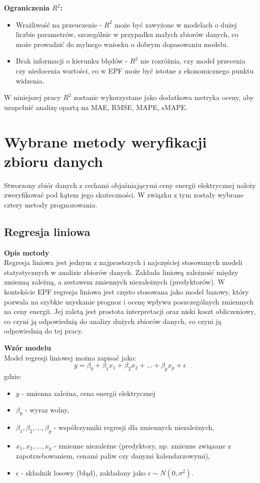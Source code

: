 \textbf{Ograniczenia \( R^2 \):}
\begin{itemize}
    \item Wrażliwość na przeuczenie - \( R^2 \) może być zawyżone w modelach o dużej liczbie parametrów, szczególnie w przypadku małych zbiorów danych, co może prowadzić do mylnego wniosku o dobrym dopasowaniu modelu.
    \item Brak informacji o kierunku błędów - \( R^2 \) nie rozróżnia, czy model przecenia czy niedocenia wartości, co w EPF może być istotne z ekonomicznego punktu widzenia.
\end{itemize}

W niniejszej pracy \( R^2 \) zostanie wykorzystane jako dodatkowa metryka oceny, aby uzupełnić analizę opartą na MAE, RMSE, MAPE, sMAPE.

\section{Wybrane metody weryfikacji zbioru danych}
\label{sec:metody_weryfikacji_zbioru_danych}

Stworzony zbiór danych z cechami objaśniającymi ceny energii elektrycznej należy zweryfikować pod kątem jego skuteczności. W związku z tym zostały wybrane cztery metody prognozowania.

\subsection{Regresja liniowa}

\textbf{Opis metody} \\
Regresja liniowa jest jednym z najprostszych i najczęściej stosowanych modeli statystycznych w analizie zbiorów danych. Zakłada liniową zależność między zmienną zależną, a zestawem zmiennych niezależnych (predyktorów). W kontekście EPF regresja liniowa jest często stosowana jako model bazowy, który pozwala na szybkie uzyskanie prognoz i ocenę wpływu poszczególnych zmiennych na ceny energii. Jej zaletą jest prostota interpretacji oraz niski koszt obliczeniowy, co czyni ją odpowiednią do analizy dużych zbiorów danych, co czyni ją odpowiednią do tej pracy.

\textbf{Wzór modelu} \\
Model regresji liniowej można zapisać jako:
\begin{equation}
y = \beta_0 + \beta_1 x_1 + \beta_2 x_2 + \dots + \beta_p x_p + \epsilon
\end{equation}
gdzie:
\begin{itemize}
    \item \( y \) - zmienna zależna, cena energii elektrycznej
    \item \( \beta_0 \) - wyraz wolny,
    \item \( \beta_1, \beta_2, \dots, \beta_p \) - współczynniki regresji dla zmiennych niezależnych,
    \item \( x_1, x_2, \dots, x_p \) - zmienne niezależne (predyktory, np. zmienne związane z zapotrzebowaniem, cenami paliw czy danymi kalendarzowymi),
    \item \( \epsilon \) - składnik losowy (błąd), zakładany jako \( \epsilon \sim N(0, \sigma^2) \).
\end{itemize}

